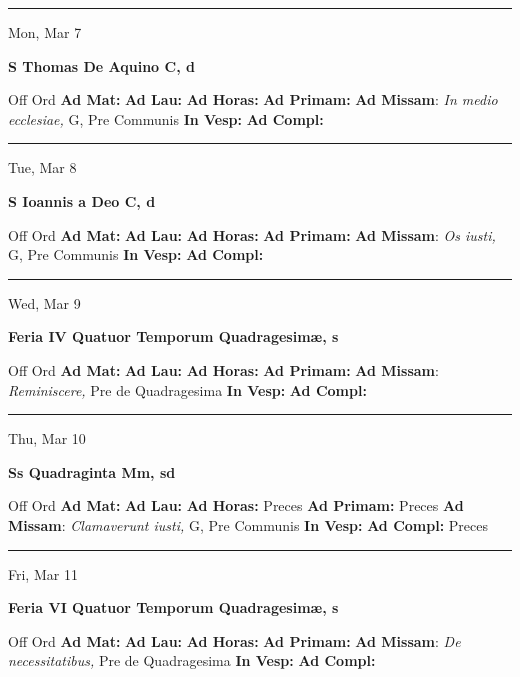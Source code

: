 \documentclass[letterpaper, 10pt]{article}
\begin{document}
\hrule
\begin{center}
Mon, Mar 7
\end{center}\textbf{ \large S Thomas De Aquino C, \textnormal{\normalsize d}}
\begin{justify}
Off Ord
\textbf{Ad Mat: }
\textbf{Ad Lau: }
\textbf{Ad Horas: }
\textbf{Ad Primam: }
\textbf{Ad Missam}: \textit{In medio ecclesiae,} G, Pre Communis
\textbf{In Vesp: }
\textbf{Ad Compl: }\end{justify}



\hrule
\begin{center}
Tue, Mar 8
\end{center}\textbf{ \large S Ioannis a Deo C, \textnormal{\normalsize d}}
\begin{justify}
Off Ord
\textbf{Ad Mat: }
\textbf{Ad Lau: }
\textbf{Ad Horas: }
\textbf{Ad Primam: }
\textbf{Ad Missam}: \textit{Os iusti,} G, Pre Communis
\textbf{In Vesp: }
\textbf{Ad Compl: }\end{justify}



\hrule
\begin{center}
Wed, Mar 9
\end{center}\textbf{ \large Feria IV Quatuor Temporum Quadragesimæ, \textnormal{\normalsize s}}
\begin{justify}
Off Ord
\textbf{Ad Mat: }
\textbf{Ad Lau: }
\textbf{Ad Horas: }
\textbf{Ad Primam: }
\textbf{Ad Missam}: \textit{Reminiscere,} Pre de Quadragesima
\textbf{In Vesp: }
\textbf{Ad Compl: }\end{justify}



\hrule
\begin{center}
Thu, Mar 10
\end{center}\textbf{ \large Ss Quadraginta Mm, \textnormal{\normalsize sd}}
\begin{justify}
Off Ord
\textbf{Ad Mat: }
\textbf{Ad Lau: }
\textbf{Ad Horas: }Preces
\textbf{Ad Primam: }Preces
\textbf{Ad Missam}: \textit{Clamaverunt iusti,} G, Pre Communis
\textbf{In Vesp: }
\textbf{Ad Compl: }Preces\end{justify}



\hrule
\begin{center}
Fri, Mar 11
\end{center}\textbf{ \large Feria VI Quatuor Temporum Quadragesimæ, \textnormal{\normalsize s}}
\begin{justify}
Off Ord
\textbf{Ad Mat: }
\textbf{Ad Lau: }
\textbf{Ad Horas: }
\textbf{Ad Primam: }
\textbf{Ad Missam}: \textit{De necessitatibus,} Pre de Quadragesima
\textbf{In Vesp: }
\textbf{Ad Compl: }\end{justify}
\end{document}
